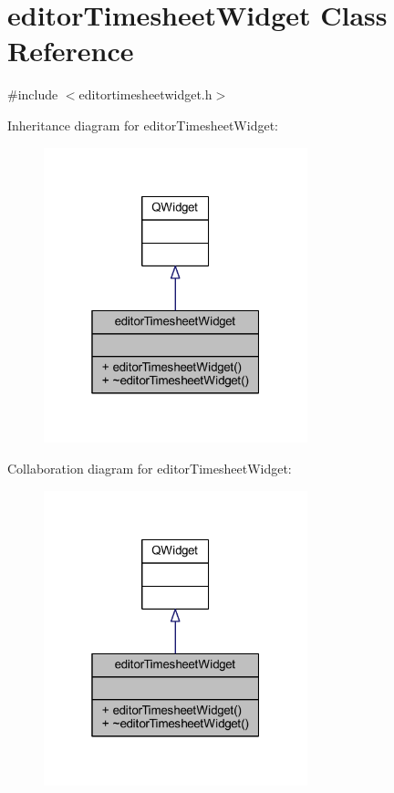 \hypertarget{classeditor_timesheet_widget}{}\section{editor\+Timesheet\+Widget Class Reference}
\label{classeditor_timesheet_widget}


{\ttfamily \#include $<$editortimesheetwidget.\+h$>$}



Inheritance diagram for editor\+Timesheet\+Widget\+:
\nopagebreak
\begin{figure}[H]
\begin{center}
\leavevmode
\includegraphics[width=217pt]{classeditor_timesheet_widget__inherit__graph}
\end{center}
\end{figure}


Collaboration diagram for editor\+Timesheet\+Widget\+:
\nopagebreak
\begin{figure}[H]
\begin{center}
\leavevmode
\includegraphics[width=217pt]{classeditor_timesheet_widget__coll__graph}
\end{center}
\end{figure}
